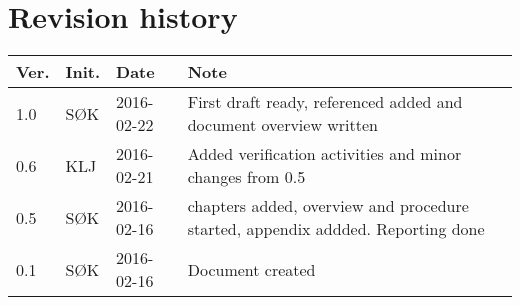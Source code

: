 \chapter*{Revision history}
\label{app:rev_his}


\begin{tabular}{b{1cm} b{1cm} b{2cm} b{8cm}}
    \textbf{Ver.} & \textbf{Init.} & \textbf{Date} & \textbf{Note} \\
    \hline
    1.0 & SØK & 2016-02-22 & First draft ready, referenced added and document overview written \\
    0.6 & KLJ & 2016-02-21 & Added verification activities and minor changes from 0.5 \\
    0.5 & SØK & 2016-02-16 & chapters added, overview and procedure started, appendix addded. Reporting done \\
    0.1 & SØK & 2016-02-16 & Document created \\
\end{tabular}
